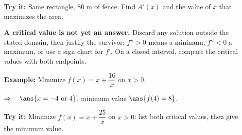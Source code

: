 \documentclass[12pt]{article}
\begin{document}
\begin{tryitbox}
\textbf{Try it:} \quad Same rectangle, $80$ m of fence. Find $A'(x)$ and the
value of $x$ that maximizes the area.\\[2pt]
\end{tryitbox}


\begin{formulabox}
\textbf{A critical value is not yet an answer.} Discard any solution outside the
stated domain, then justify the survivor: $f'' > 0$ means a minimum, $f'' < 0$ a
maximum, or use a sign chart for $f'$. On a closed interval, compare the
critical values with both endpoints.
\end{formulabox}

\begin{examplebox}
\textbf{Example:} \quad Minimize $f(x) = x + \dfrac{16}{x}$ on $x > 0$.

$\Rightarrow\quad \ans{x = -4 \text{ or } 4}$, \quad minimum value $\ans{f(4) = 8}$.
\end{examplebox}

\begin{tryitbox}
\textbf{Try it:} \quad Minimize $f(x) = x + \dfrac{25}{x}$ on $x > 0$: list both
critical values, then give the minimum value.\\[2pt]
\end{tryitbox}
\end{document}
